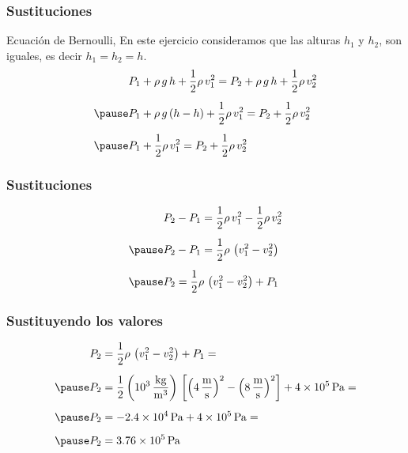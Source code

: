 \documentclass[14pt]{beamer}
\begin{document}
\begin{frame}
\frametitle{Sustituciones}
Ecuación de Bernoulli, \pause En este ejercicio consideramos que las alturas $h_{1}$ y $h_{2}$, son iguales, es decir $h_{1} = h_{2} = h$.
\pause
\begin{eqnarray*}
\begin{aligned}
&P_{1} + \rho \, g \, h + \dfrac{1}{2} \rho \, v_{1}^{2} = P_{2} + \rho \, g \, h + \dfrac{1}{2} \rho \, v_{2}^{2} \\[0.5em] \pause
&P_{1} + \rho \, g \, (h - h) + \dfrac{1}{2} \rho \, v_{1}^{2} = P_{2} + \dfrac{1}{2} \rho \, v_{2}^{2} \\[0.5em] \pause
&P_{1} + \dfrac{1}{2} \rho \, v_{1}^{2} = P_{2} + \dfrac{1}{2} \rho \, v_{2}^{2}
\end{aligned}
\end{eqnarray*}
\end{frame}
\begin{frame}
\frametitle{Sustituciones}
\begin{eqnarray*}
\begin{aligned}    
&P_{2} - P_{1} = \dfrac{1}{2} \rho \, v_{1}^{2} - \dfrac{1}{2} \rho \, v_{2}^{2} \\[0.5em] \pause
&P_{2} - P_{1} = \dfrac{1}{2} \rho \, \left( v_{1}^{2} - v_{2}^{2} \right) \\[0.5em] \pause
&P_{2} = \dfrac{1}{2} \rho \, \left( v_{1}^{2} - v_{2}^{2} \right) + P_{1}
\end{aligned}
\end{eqnarray*}
\end{frame}
\begin{frame}
\frametitle{Sustituyendo los valores}
\begin{eqnarray*}
\begin{aligned}
P_{2} &= \dfrac{1}{2} \rho \, \left( v_{1}^{2} - v_{2}^{2} \right) + P_{1} = \\[0.5em] \pause
P_{2} &= \dfrac{1}{2} \left( \SI[per-mode=fraction]{d3}{\kilo\gram\per\cubic\meter} \right) \, \left[ \left( \SI[per-mode=fraction]{4}{\meter\per\second} \right)^{2} - \left( \SI[per-mode=fraction]{8}{\meter\per\second} \right)^{2} \right] + \SI{4d5}{\pascal} =  \\[0.5em] \pause
P_{2} &= - \SI{2.4d4}{\pascal} + \SI{4d5}{\pascal} =  \\[0.5em] \pause
P_{2} &= \SI{3.76d5}{\pascal}
\end{aligned}
\end{eqnarray*}
\end{frame}
\end{document}
